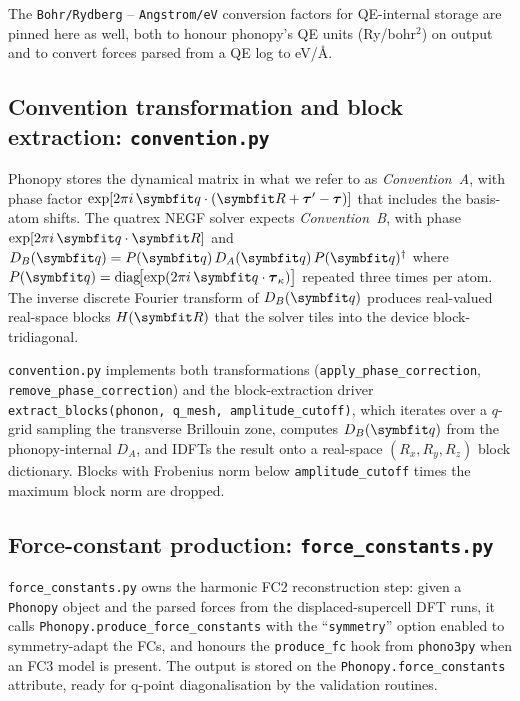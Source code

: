 The \texttt{Bohr/Rydberg} -- \texttt{Angstrom/eV} conversion factors
for QE-internal storage are pinned here as well, both to honour
phonopy's QE units (Ry/bohr$^2$) on output and to convert forces
parsed from a QE log to eV/\AA{}.

\subsection{Convention transformation and block extraction: \texttt{convention.py}}
\label{sec:convention}

Phonopy stores the dynamical matrix in what we refer to as
\emph{Convention~A}, with phase factor
$\exp[2\pi i\,\vc{q}\cdot(\vc{R} + \boldsymbol{\tau}' - \boldsymbol{\tau})]$
that includes the basis-atom shifts.  The quatrex NEGF solver expects
\emph{Convention~B}, with phase $\exp[2\pi i\,\vc{q}\cdot\vc{R}]$ and
$D_B(\vc{q}) = P(\vc{q})\,D_A(\vc{q})\,P(\vc{q})^\dagger$ where
$P(\vc{q}) = \mathrm{diag}\!\bigl[\exp(2\pi i\,\vc{q}\cdot\boldsymbol{\tau}_\kappa)\bigr]$
repeated three times per atom.  The inverse discrete Fourier
transform of $D_B(\vc{q})$ produces real-valued real-space blocks
$H(\vc{R})$ that the solver tiles into the device block-tridiagonal.

\texttt{convention.py} implements both transformations
(\texttt{apply\_phase\_correction}, \texttt{remove\_phase\_correction})
and the block-extraction driver \texttt{extract\_blocks(phonon,
q\_mesh, amplitude\_cutoff)}, which iterates over a $q$-grid sampling
the transverse Brillouin zone, computes $D_B(\vc{q})$ from the
phonopy-internal $D_A$, and IDFTs the result onto a real-space
$(R_x, R_y, R_z)$ block dictionary.  Blocks with Frobenius norm
below \texttt{amplitude\_cutoff} times the maximum block norm are
dropped.

\subsection{Force-constant production: \texttt{force\_constants.py}}
\label{sec:fc_production}

\texttt{force\_constants.py} owns the harmonic FC2 reconstruction
step: given a \texttt{Phonopy} object and the parsed forces from the
displaced-supercell DFT runs, it calls
\texttt{Phonopy.produce\_force\_constants} with the
``\texttt{symmetry}'' option enabled to symmetry-adapt the FCs, and
honours the \texttt{produce\_fc} hook from \texttt{phono3py} when an
FC3 model is present.  The output is stored on the
\texttt{Phonopy.force\_constants} attribute, ready for q-point
diagonalisation by the validation routines.

